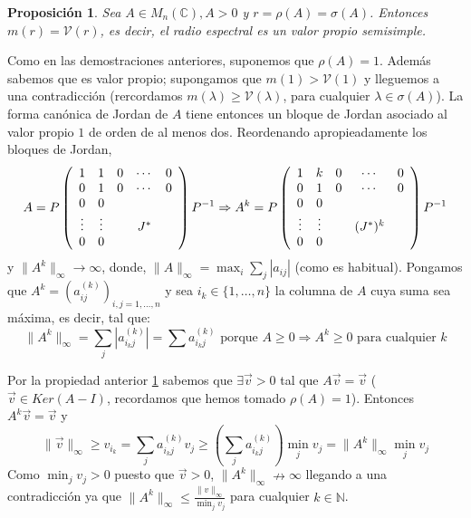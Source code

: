 \documentclass[size=a4, parskip=half, titlepage=false, toc=flat, toc=bib, 12pt]{scrartcl}
\makeatletter
\renewenvironment{proof}[1][\proofname] {\par\pushQED{\qed}\normalfont\topsep6\p@\@plus6\p@\relax\trivlist\item[\hskip\labelsep\itshape\tgpaella#1\@addpunct{.}]\ignorespaces}{\popQED\endtrivlist\@endpefalse}
\theoremstyle{theorem-style}
\newtheorem{nprop}{Proposición}[section]
\theoremstyle{definition-style}
\theoremstyle{remark-style}
\theoremstyle{example-style}
\theoremstyle{definition-style}
\theoremstyle{remark-style}
\makeatother
\begin{document}
\begin{nprop}
\label{vpropio}
Sea $A \in M_n(\mathbb{C}), A > 0$ y $r = \rho(A) = \sigma(A)$. Entonces $m(r) = \mathcal{V}(r)$, es decir, el radio espectral es un valor propio semisimple.
\end{nprop}
\begin{proof}
Como en las demostraciones anteriores, suponemos que $\rho(A) = 1$. Además sabemos que es valor propio; supongamos que $m(1) > \mathcal{V}(1)$ y lleguemos a una contradicción (rercordamos $m(\lambda) \geq \mathcal{V}(\lambda)$, para cualquier $\lambda \in \sigma(A)$).
La forma canónica de Jordan de $A$ tiene entonces un bloque de Jordan asociado al valor propio $1$ de orden de al menos dos.
Reordenando apropieadamente los bloques de Jordan,
$$A = P \left(
      \begin{array}{{ccccc}}
        1     &      1    &    0    & \cdots & 0   \\
        0    &    1      &    0    &   \cdots & 0  \\
        0    &    0      &   &     \\
        \vdots    &    \vdots      &      & J^* & \\
        0 & 0 & & &
      \end{array}
\right) P^{-1} \Rightarrow A^k = P \left(
      \begin{array}{{ccccc}}
        1     &      k    &    0    & \cdots & 0   \\
        0    &    1      &    0    &   \cdots & 0  \\
        0    &    0      &   &     \\
        \vdots    &    \vdots      &      & (J^*)^k & \\
        0 & 0 & & &
      \end{array}
\right) P^{-1}$$
y $\|A^k\|_{\infty} \rightarrow \infty$, donde, $\|A\|_{\infty} = \max_i \sum_j |a_{ij}|$ (como es habitual). Pongamos que $A^k = (a_{ij}^{(k)})_{i,j = 1, \dots, n}$ y sea $i_k \in \{1, \dots, n\}$ la columna de $A$ cuya suma sea máxima, es decir,  tal que:
$$\|A^k\|_{\infty} = \sum_j |a_{i_k j}^{(k)}| = \sum a_{i_k j}^{(k)} \textrm{ porque } A \geq 0 \Rightarrow A^k \geq 0 \textrm{ para cualquier }k$$

Por la propiedad anterior \ref{vpropio} sabemos que $\exists \vec{v}>0$ tal que $A \vec{v} = \vec{v}$ ($\vec{v} \in Ker(A - I)$, recordamos que hemos tomado $\rho(A) = 1$).
Entonces $A^k \vec{v} = \vec{v}$ y $$ \|\vec{v}\|_{\infty} \geq v_{i_k} = \sum_j a_{i_k j}^{(k)} v_j \geq \left( \sum_j a_{i_k j}^{(k)} \right) \min_j v_j = \|A^k \|_{\infty} \min_j v_j$$
Como $\min_j v_j > 0$ puesto que $\vec{v} > 0$, $\|A^k\|_{\infty} \nrightarrow \infty$ llegando a una contradicción ya que $\|A^k\|_{\infty} \leq \frac{\|v\|_{\infty}}{\min_j v_j}$ para cualquier $k \in \mathbb{N}$.
\end{proof}
\end{document}
